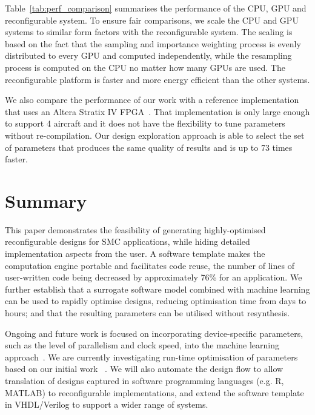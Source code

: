 Table~\ref{tab:perf_comparison} summarises the performance of the CPU, GPU and reconfigurable system.
To ensure fair comparisons, we scale the CPU and GPU systems to similar form factors with the reconfigurable system.
The scaling is based on the fact that the sampling and importance weighting process is evenly distributed to every GPU and computed independently,
while the resampling process is computed on the CPU no matter how many GPUs are used.
The reconfigurable platform is faster and more energy efficient than the other systems.

We also compare the performance of our work with a reference implementation that uses an Altera Stratix IV FPGA~\cite{chau13b}.
That implementation is only large enough to support 4 aircraft and it does not have the flexibility to tune parameters without re-compilation.
Our design exploration approach is able to select the set of parameters that produces the same quality of results and is up to 73 times faster.



\section{Summary}
\label{sec:summary}

This paper demonstrates the feasibility of generating highly-optimised reconfigurable designs for SMC applications, while hiding detailed implementation aspects from the user.  
A software template makes the computation engine portable and facilitates code reuse, the number of lines of user-written code being decreased by approximately 76\% for an application.
We further establish that a surrogate software model combined with machine learning can be used to rapidly optimise designs, reducing optimisation time from days to hours; 
and that the resulting parameters can be utilised without resynthesis. 

Ongoing and future work is focused on incorporating device-specific parameters, such as the level of parallelism and clock speed, into the machine learning approach~\cite{kurek14}.
We are currently investigating run-time optimisation of parameters based on our initial work ~\cite{chau13a}.
We will also automate the design flow to allow translation of designs captured in software programming languages (e.g. R, MATLAB) to reconfigurable implementations,
and extend the software template in VHDL/Verilog to support a wider range of systems.

